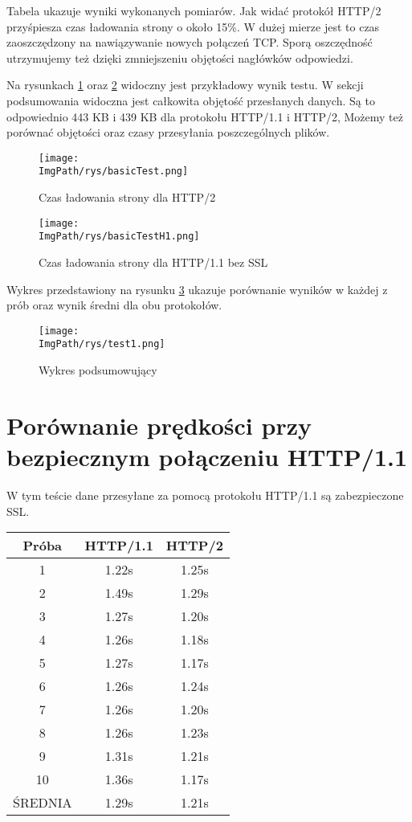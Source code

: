 \documentclass[a4paper,12pt,twoside,openany]{report}
\newcommand{\ImgPath}{.}
\begin{document}
Tabela ukazuje wyniki wykonanych pomiarów.
Jak widać protokół HTTP/2 przyśpiesza czas ładowania strony o około 15\%.
W dużej mierze jest to czas zaoszczędzony na nawiązywanie nowych połączeń TCP.
Sporą oszczędność utrzymujemy też dzięki zmniejszeniu objętości nagłówków odpowiedzi.

Na rysunkach \ref{schematBasicTest} oraz \ref{schematBasicTestH1} widoczny jest przykładowy wynik testu.
W sekcji podsumowania widoczna jest całkowita objętość przesłanych danych. Są to odpowiednio 443 KB i 439 KB dla protokołu HTTP/1.1 i HTTP/2,
Możemy też porównać objętości oraz czasy przesyłania poszczególnych plików.

\begin{figure}[!htbp]
	\begin{center}
\centering
\texttt{[image: \\ImgPath/rys/basicTest.png]}
\end{center}
	\caption{Czas ładowania strony dla HTTP/2}
	\label{schematBasicTest}
\end{figure}

\begin{figure}[!htbp]
	\begin{center}
\centering
\texttt{[image: \\ImgPath/rys/basicTestH1.png]}
\end{center}
	\caption{Czas ładowania strony dla HTTP/1.1 bez SSL}
	\label{schematBasicTestH1}
\end{figure}

Wykres przedstawiony na rysunku \ref{schematTest1} ukazuje porównanie wyników w każdej z prób oraz wynik średni dla obu protokołów.

\begin{figure}[!htbp]
	\begin{center}
\centering
\texttt{[image: \\ImgPath/rys/test1.png]}
\end{center}
	\caption{Wykres podsumowujący}
	\label{schematTest1}
\end{figure}

\section{Porównanie prędkości przy bezpiecznym połączeniu HTTP/1.1}

W tym teście dane przesyłane za pomocą protokołu HTTP/1.1 są zabezpieczone SSL.

\begin{tabular}{c|c|c}
Próba & HTTP/1.1 & HTTP/2 \\ \hline
1 & 1.22s & 1.25s \\
2 & 1.49s & 1.29s \\
3 & 1.27s & 1.20s \\
4 & 1.26s & 1.18s \\
5 & 1.27s & 1.17s \\
6 & 1.26s & 1.24s \\
7 & 1.26s & 1.20s \\
8 & 1.26s & 1.23s \\
9 & 1.31s & 1.21s \\
10 & 1.36s & 1.17s\\ \hline
ŚREDNIA & 1.29s & 1.21s \\
\end{tabular}
\end{document}
